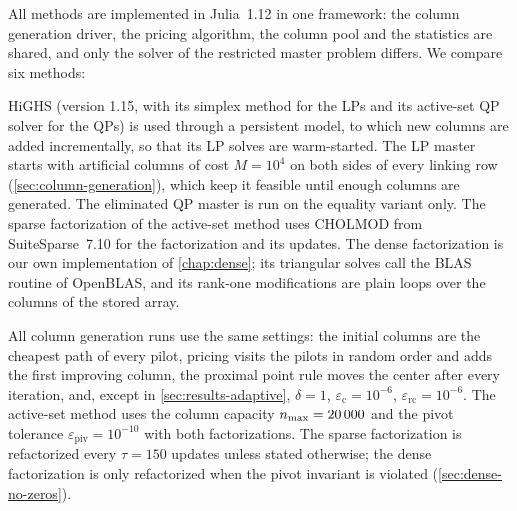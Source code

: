 All methods are implemented in Julia~1.12 \cite{bezanson2017julia} in one framework: the
column generation driver, the pricing algorithm, the column pool and the statistics are
shared, and only the solver of the restricted master problem differs. We compare six
methods:

\begin{center}
\renewcommand{\arraystretch}{1.2}
\end{center}

HiGHS \cite{huangfu2018parallelizing} (version 1.15, with its simplex method for the LPs and
its active-set QP solver for the QPs) is used through a persistent model, to which new columns
are added incrementally, so that its LP solves are warm-started. The LP master starts with
artificial columns of cost $M = 10^4$ on both sides of every linking row (\cref{sec:column-generation}),
which keep it feasible until enough columns are generated. The eliminated QP master is
run on the equality variant only. The sparse
factorization of the active-set method uses CHOLMOD \cite{chen2008cholmod} from SuiteSparse~7.10
for the factorization and its updates. The dense factorization is our own implementation of
\cref{chap:dense}; its triangular solves call the BLAS routine  of OpenBLAS, and
its rank-one modifications are plain loops over the columns of the stored array.

\medskip

All column generation runs use the same settings: the initial columns are the cheapest path
of every pilot, pricing visits the pilots in random order and adds the first improving
column, the proximal point rule moves the center after every iteration, and, except in
\cref{sec:results-adaptive}, $\delta = 1$,
$\varepsilon_{\mathrm{c}} = 10^{-6}$, $\varepsilon_{\mathrm{rc}} = 10^{-6}$. The active-set
method uses the column capacity $n_{\max} = 20\,000$ and the pivot tolerance
$\varepsilon_{\mathrm{piv}} = 10^{-10}$ with both factorizations. The sparse factorization is
refactorized every $\tau = 150$ updates unless stated otherwise; the dense factorization is
only refactorized when the pivot invariant is violated (\cref{sec:dense-no-zeros}).

